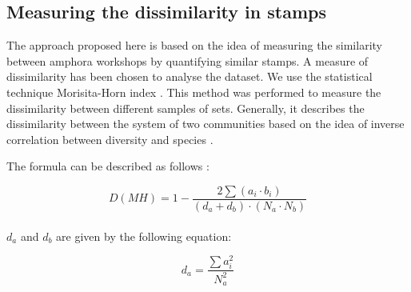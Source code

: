 \documentclass[review]{elsarticle}
\newcommand{\memo}[2]{\textcolor{#1}{#2}}
\newcommand{\xavi}[1]{\memo{magenta}{XRC: #1\\}}
\begin{document}


\subsection{Measuring the dissimilarity in stamps}



The approach proposed here is based on the idea of measuring the similarity between amphora workshops by quantifying similar stamps. A measure of dissimilarity has been chosen to analyse the dataset. We use the statistical technique Morisita-Horn index \citep{morisita_measuring_1959, horn_measurement_1966}. This method was performed to measure the dissimilarity between different samples of sets. Generally, it describes the dissimilarity between the system of two communities based on the idea of inverse correlation between diversity and species \citep{magurran_why_1988}.

The formula can be described as follows \citep{magurran_measuring_2013}:

\begin{equation}
D(MH) = 1- \frac{2 \sum(a_{i} \cdot b_{i})}{(d_{a} + d_{b}) \cdot (N_{a} \cdot N_{b})}
\end{equation} \\

$d_{a}$ and $d_{b}$ are given by the following equation:

\begin{equation}
d_{a} = \frac{\sum a_{i}^{2}}{N_{a}^{2}} 
\end{equation} \\
\end{document}
